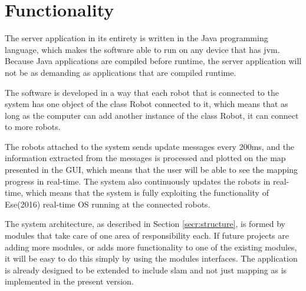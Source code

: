 \newpage
\section{Functionality}
\label{secr:functionality}
The server application in its entirety is written in the Java programming language, which makes the software able to run on any device that has \acrlong{jvm}. Because Java applications are compiled before runtime, the server application will not be as demanding as applications that are compiled runtime. 

The software is developed in a way that each robot that is connected to the system has one object of the class Robot connected to it, which means that as long as the computer can add another instance of the class Robot, it can connect to more robots. 

The robots attached to the system sends update messages every 200ms, and the information extracted from the messages is processed and plotted on the map presented in the GUI, which means that the user will be able to see the mapping progress in real-time. The system also continuously updates the robots in real-time, which means that the system is fully exploiting the functionality of Ese(2016) real-time OS running at the connected robots.

The system architecture, as described in Section \ref{secr:structure}, is formed by modules that take care of one area of responsibility each. If future projects are adding more modules, or adds more functionality to one of the existing modules, it will be easy to do this simply by using the modules interfaces. The application is already designed to be extended to include \acrfull{slam} and not just mapping as is implemented in the present version.
